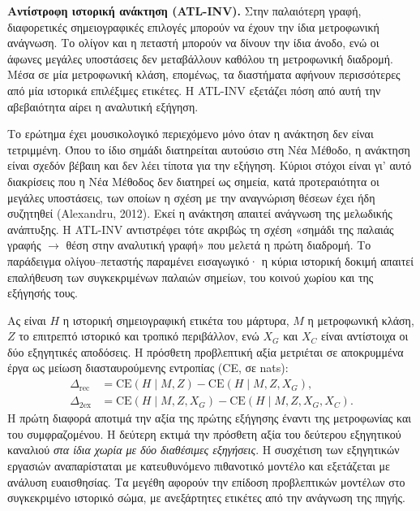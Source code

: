 \documentclass[11pt,a4paper]{article}
\begin{document}
\textbf{Αντίστροφη ιστορική ανάκτηση (ATL-INV).} Στην παλαιότερη γραφή, διαφορετικές σημειογραφικές επιλογές μπορούν να έχουν την ίδια μετροφωνική ανάγνωση. Το ολίγον και η πεταστή μπορούν να δίνουν την ίδια άνοδο, ενώ οι άφωνες μεγάλες υποστάσεις δεν μεταβάλλουν καθόλου τη μετροφωνική διαδρομή. Μέσα σε μία μετροφωνική κλάση, επομένως, τα διαστήματα αφήνουν περισσότερες από μία ιστορικά επιλέξιμες ετικέτες. Η ATL-INV εξετάζει πόση από αυτή την αβεβαιότητα αίρει η αναλυτική εξήγηση.

Το ερώτημα έχει μουσικολογικό περιεχόμενο μόνο όταν η ανάκτηση δεν είναι τετριμμένη. Όπου το ίδιο σημάδι διατηρείται αυτούσιο στη Νέα Μέθοδο, η ανάκτηση είναι σχεδόν βέβαιη και δεν λέει τίποτα για την εξήγηση. Κύριοι στόχοι είναι γι' αυτό διακρίσεις που η Νέα Μέθοδος δεν διατηρεί ως σημεία, κατά προτεραιότητα οι μεγάλες υποστάσεις, των οποίων η σχέση με την αναγνώριση θέσεων έχει ήδη συζητηθεί (Alexandru, 2012). Εκεί η ανάκτηση απαιτεί ανάγνωση της μελωδικής ανάπτυξης. Η ATL-INV αντιστρέφει τότε ακριβώς τη σχέση «σημάδι της παλαιάς γραφής $\rightarrow$ θέση στην αναλυτική γραφή» που μελετά η πρώτη διαδρομή. Το παράδειγμα ολίγου--πεταστής παραμένει εισαγωγικό· η κύρια ιστορική δοκιμή απαιτεί επαλήθευση των συγκεκριμένων παλαιών σημείων, του κοινού χωρίου και της εξήγησής τους.

Ας είναι $H$ η ιστορική σημειογραφική ετικέτα του μάρτυρα, $M$ η μετροφωνική κλάση, $Z$ το επιτρεπτό ιστορικό και τροπικό περιβάλλον, ενώ $X_G$ και $X_C$ είναι αντίστοιχα οι δύο εξηγητικές αποδόσεις. Η πρόσθετη προβλεπτική αξία μετριέται σε αποκρυμμένα έργα ως μείωση διασταυρούμενης εντροπίας (CE, σε nats):
\begin{align}
\Delta_{\mathrm{rec}} &= \mathrm{CE}(H\mid M,Z)-\mathrm{CE}(H\mid M,Z,X_G),\\
\Delta_{\mathrm{2ex}} &= \mathrm{CE}(H\mid M,Z,X_G)-\mathrm{CE}(H\mid M,Z,X_G,X_C).
\end{align}
Η πρώτη διαφορά αποτιμά την αξία της πρώτης εξήγησης έναντι της μετροφωνίας και του συμφραζομένου. Η δεύτερη εκτιμά την πρόσθετη αξία του δεύτερου εξηγητικού καναλιού \emph{στα ίδια χωρία με δύο διαθέσιμες εξηγήσεις}. Η συσχέτιση των εξηγητικών εργασιών αναπαρίσταται με κατευθυνόμενο πιθανοτικό μοντέλο και εξετάζεται με ανάλυση ευαισθησίας. Τα μεγέθη αφορούν την επίδοση προβλεπτικών μοντέλων στο συγκεκριμένο ιστορικό σώμα, με ανεξάρτητες ετικέτες από την ανάγνωση της πηγής.
\end{document}
